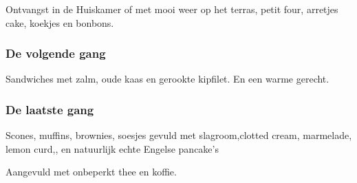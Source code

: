 Ontvangst in de Huiskamer of met mooi weer op het terras,
petit four, arretjes cake,  koekjes en bonbons.

\subsubsection*{De volgende gang}

Sandwiches met zalm, oude kaas en gerookte kipfilet.
En een warme gerecht.

\subsubsection*{De laatste gang}
Scones, muffins, brownies, soesjes gevuld met slagroom,clotted cream, marmelade, lemon curd,, en natuurlijk echte Engelse pancake’s

Aangevuld met onbeperkt thee en koffie.
